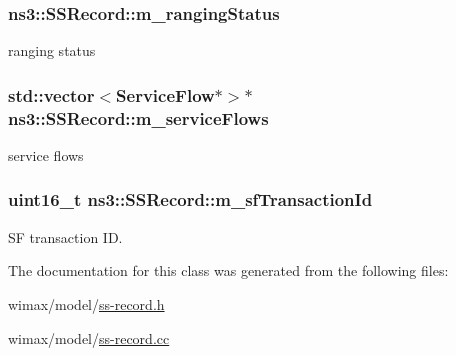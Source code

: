\subsubsection[{\texorpdfstring{m\+\_\+ranging\+Status}{m_rangingStatus}}]{ ns3\+::\+S\+S\+Record\+::m\+\_\+ranging\+Status\hspace{0.3cm}{\ttfamily [private]}}\hypertarget{classns3_1_1SSRecord_a0d544f144c5265eb922c6a92c0b93f87}{}\label{classns3_1_1SSRecord_a0d544f144c5265eb922c6a92c0b93f87}


ranging status 

\subsubsection[{\texorpdfstring{m\+\_\+service\+Flows}{m_serviceFlows}}]{\setlength{\rightskip}{0pt plus 5cm}std\+::vector$<${\bf Service\+Flow}$\ast$$>$$\ast$ ns3\+::\+S\+S\+Record\+::m\+\_\+service\+Flows\hspace{0.3cm}{\ttfamily [private]}}\hypertarget{classns3_1_1SSRecord_a8bff04f40a04179469fcdbf4560d12b3}{}\label{classns3_1_1SSRecord_a8bff04f40a04179469fcdbf4560d12b3}


service flows 

\subsubsection[{\texorpdfstring{m\+\_\+sf\+Transaction\+Id}{m_sfTransactionId}}]{\setlength{\rightskip}{0pt plus 5cm}uint16\+\_\+t ns3\+::\+S\+S\+Record\+::m\+\_\+sf\+Transaction\+Id\hspace{0.3cm}{\ttfamily [private]}}\hypertarget{classns3_1_1SSRecord_ae0fc6dfc404423bacb407dcfb806a5e3}{}\label{classns3_1_1SSRecord_ae0fc6dfc404423bacb407dcfb806a5e3}


SF transaction ID. 



The documentation for this class was generated from the following files\+:\begin{DoxyCompactItemize}
\item 
wimax/model/\hyperlink{ss-record_8h}{ss-\/record.\+h}\item 
wimax/model/\hyperlink{ss-record_8cc}{ss-\/record.\+cc}\end{DoxyCompactItemize}
